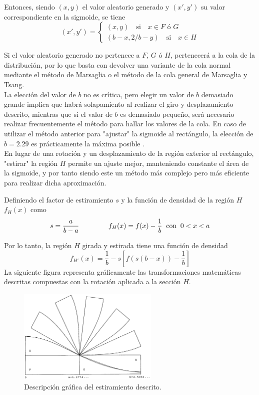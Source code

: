 \documentclass[a4paper,12pt]{article}
\begin{document}
	Entonces, siendo $(x,y)$ el valor aleatorio generado y $(x',y')$ su valor correspondiente en la sigmoide, se tiene
	$$
	(x',y') = 
	\begin{cases}
		(x,y) \quad \text{si} \quad x\in F \text{ ó } G \\
		(b-x,2/b-y) \quad \text{si} \quad x \in H
	\end{cases}
	$$  
	
	Si el valor aleatorio generado no pertenece a $F$, $G$ ó $H$, pertenecerá a la cola de la distribución, por lo que basta con devolver una variante de la cola normal mediante el método de Marsaglia o el método de la cola general de Marsaglia y Tsang.\\
		
	La elección del valor de $b$ no es crítica, pero elegir un valor de $b$ demasiado grande implica que habrá solapamiento al realizar el giro y desplazamiento descrito, mientras que si el valor de $b$ es demasiado pequeño, será necesario realizar frecuentemente el método para hallar los valores de la cola.
	En caso de utilizar el método anterior para "ajustar" la sigmoide al rectángulo, la elección de $b=2.29$ es prácticamente la máxima posible \cite{monty-python}. \\
		
	En lugar de una rotación y un desplazamiento de la región exterior al rectángulo, "estirar" la región $H$ permite un ajuste mejor, manteniendo constante el área de la sigmoide, y por tanto siendo este un método más complejo pero más eficiente para realizar dicha aproximación. 
	
	Definiendo el factor de estiramiento $s$ y la función de densidad de la región $H$ $f_H(x)$ como 
	$$s=\dfrac{a}{b-a} \hspace{1.5cm} f_H(x)=f(x)-\dfrac{1}{b} \hspace{2mm} \text{con} \hspace{2mm} 0<x<a $$
	
	Por lo tanto, la región $H$ girada y estirada tiene una función de densidad
	$$ f_{H'}(x) = \dfrac{1}{b} - s  \left[ f(s (b-x) ) -\dfrac{1}{b} \right] $$ 
	La siguiente figura representa gráficamente las transformaciones matemáticas descritas compuestas con la rotación aplicada a la sección $H$. 
	
	\begin{figure}[H]
		\centering
		\includegraphics[width=0.6\textwidth]{include/stretching_sigmoid.png}
		\caption{Descripción gráfica del estiramiento descrito. \cite{monty-python}}
	\end{figure}
	
\end{document}
